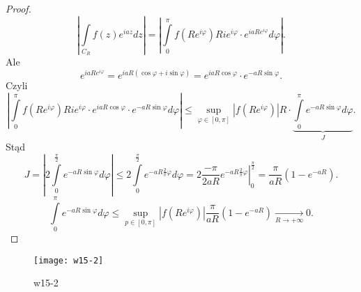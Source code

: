 \documentclass[../main.tex]{subfiles}
\begin{document}
\begin{proof}
    \[
        \left| \int\limits_{C_R} f(z)e^{iaz}dz\right| = \left| \int\limits_{0}^\pi f(Re^{i\varphi}) Rie^{i\varphi}\cdot e^{iaRe^{i\varphi}}d\varphi\right|
    .\]
Ale
\[
    e^{iaRe^{i\varphi}} = e^{iaR(\cos\varphi + i\sin\varphi)} = e^{iaR\cos\varphi} \cdot e^{-aR\sin\varphi}
.\]
Czyli
\[
    \left| \int\limits_{0}^\pi f(Re^{i\varphi})Rie^{i\varphi}\cdot e^{iaR\cos\varphi}\cdot e^{-aR\sin\varphi}d\varphi \right| \le \underset{\varphi\in[0,\pi]}{\sup}\left| f(Re^{i\varphi}) \right| R\cdot \underbrace{\int\limits_{0}^{\pi}e^{-aR\sin\varphi}d\varphi}_{J}
.\]
Stąd
\[
    J = \left| 2\int\limits_{0}^{\frac{\pi}{2}}e^{-aR\sin\varphi}d\varphi \right| \le 2\int\limits_{0}^{\frac{\pi}{2}}e^{-aR \frac{2}{\pi}\varphi}d\varphi = 2 \left.\frac{-\pi}{2aR}e^{-aR \frac{2}{\pi}\varphi}\right|_0^{\frac{\pi}{2}} = \frac{\pi}{aR}\left( 1 - e^{-aR} \right)
.\]
\[
    \int\limits_{0}^{\pi}e^{-aR\sin\varphi}d\varphi \le \underset{p\in[0,\pi]}{\sup} \left| f(Re^{i\varphi}) \right| \frac{\pi}{aR}\left( 1-e^{-aR} \right) \underset{R\to +\infty}{\longrightarrow} 0
.\]
\end{proof}
\begin{figure}[h]
    \centering
    \texttt{[image: w15-2]}
    \caption{w15-2}
    \label{fig:w15-2}
\end{figure}
\end{document}
